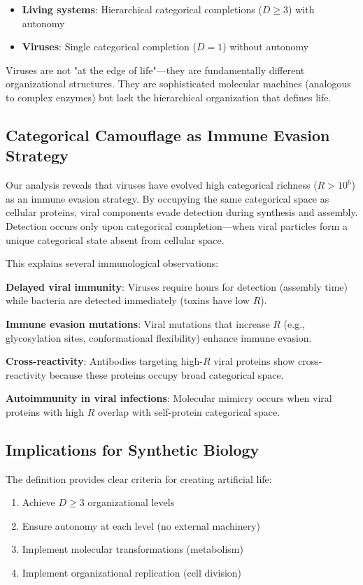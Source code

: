 \documentclass[11pt]{article}
\begin{document}
\begin{itemize}
\item \textbf{Living systems}: Hierarchical categorical completions ($D \geq 3$) with autonomy
\item \textbf{Viruses}: Single categorical completion ($D = 1$) without autonomy
\end{itemize}

Viruses are not "at the edge of life"—they are fundamentally different organizational structures. They are sophisticated molecular machines (analogous to complex enzymes) but lack the hierarchical organization that defines life.

\subsection{Categorical Camouflage as Immune Evasion Strategy}

Our analysis reveals that viruses have evolved high categorical richness ($R > 10^6$) as an immune evasion strategy. By occupying the same categorical space as cellular proteins, viral components evade detection during synthesis and assembly. Detection occurs only upon categorical completion—when viral particles form a unique categorical state absent from cellular space.

This explains several immunological observations:

\textbf{Delayed viral immunity}: Viruses require hours for detection (assembly time) while bacteria are detected immediately (toxins have low $R$).

\textbf{Immune evasion mutations}: Viral mutations that increase $R$ (e.g., glycosylation sites, conformational flexibility) enhance immune evasion.

\textbf{Cross-reactivity}: Antibodies targeting high-$R$ viral proteins show cross-reactivity because these proteins occupy broad categorical space.

\textbf{Autoimmunity in viral infections}: Molecular mimicry occurs when viral proteins with high $R$ overlap with self-protein categorical space.

\subsection{Implications for Synthetic Biology}

The definition provides clear criteria for creating artificial life:

\begin{enumerate}
\item Achieve $D \geq 3$ organizational levels
\item Ensure autonomy at each level (no external machinery)
\item Implement molecular transformations (metabolism)
\item Implement organizational replication (cell division)
\end{enumerate}
\end{document}
